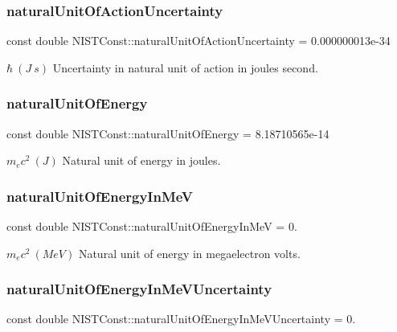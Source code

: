 \subsubsection{\texorpdfstring{natural\+Unit\+Of\+Action\+Uncertainty}{naturalUnitOfActionUncertainty}}
{\footnotesize\ttfamily const double N\+I\+S\+T\+Const\+::natural\+Unit\+Of\+Action\+Uncertainty = 0.\+000000013e-\/34}

$\hbar \ (J\ s)$ Uncertainty in natural unit of action in joules second. \mbox{\label{group___natural_unit_ga8b044e82e055305f63f6f0a8255931b9}} 
\subsubsection{\texorpdfstring{natural\+Unit\+Of\+Energy}{naturalUnitOfEnergy}}
{\footnotesize\ttfamily const double N\+I\+S\+T\+Const\+::natural\+Unit\+Of\+Energy = 8.\+18710565e-\/14}

$m_e c^2 \ (J)$ Natural unit of energy in joules. \mbox{\label{group___natural_unit_ga2ff9cea4ca8c13fdefb9d89a71e892b2}} 
\subsubsection{\texorpdfstring{natural\+Unit\+Of\+Energy\+In\+MeV}{naturalUnitOfEnergyInMeV}}
{\footnotesize\ttfamily const double N\+I\+S\+T\+Const\+::natural\+Unit\+Of\+Energy\+In\+MeV = 0.}

$m_e c^2 \ (MeV)$ Natural unit of energy in megaelectron volts. \mbox{\label{group___natural_unit_ga7669f513a9dbcb0eb24eca6f9de39f0f}} 
\subsubsection{\texorpdfstring{natural\+Unit\+Of\+Energy\+In\+Me\+V\+Uncertainty}{naturalUnitOfEnergyInMeVUncertainty}}
{\footnotesize\ttfamily const double N\+I\+S\+T\+Const\+::natural\+Unit\+Of\+Energy\+In\+Me\+V\+Uncertainty = 0.}

